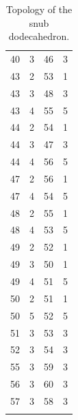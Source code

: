 \documentclass[a4paper, amsfonts, amssymb, amsmath, reprint, showkeys, nofootinbib, oneside]{revtex4-1}
\begin{document}
\begin{longtable}[h!]{ cccc }
	40 & 3 & 46 & 3 \\
	43 & 2 & 53 & 1 \\
	43 & 3 & 48 & 3 \\
	43 & 4 & 55 & 5 \\
	44 & 2 & 54 & 1 \\
	44 & 3 & 47 & 3 \\
	44 & 4 & 56 & 5 \\
	47 & 2 & 56 & 1 \\
	47 & 4 & 54 & 5 \\
	48 & 2 & 55 & 1 \\
	48 & 4 & 53 & 5 \\
	49 & 2 & 52 & 1 \\
	49 & 3 & 50 & 1 \\
	49 & 4 & 51 & 5 \\
	50 & 2 & 51 & 1 \\
	50 & 5 & 52 & 5 \\
	51 & 3 & 53 & 3 \\
	52 & 3 & 54 & 3 \\
	55 & 3 & 59 & 3 \\
	56 & 3 & 60 & 3 \\
	57 & 3 & 58 & 3 \\
	\hline
	\caption{Topology of the snub dodecahedron.}
\end{longtable}
\end{document}
